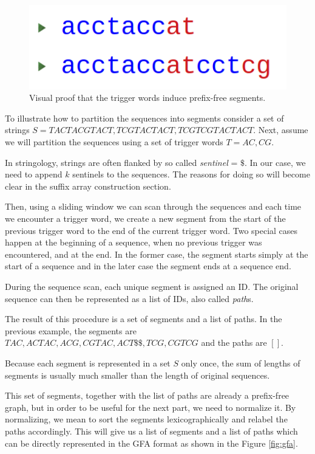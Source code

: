 \documentclass[twocolumn]{ceurart}
\begin{document}
\begin{figure}
    \centering
    \includegraphics[width=\linewidth]{images/prefixfree_proof.png}
    \caption{Visual proof that the trigger words induce prefix-free segments.}
    \label{fig:proof}
\end{figure}

To illustrate how to partition the sequences into segments consider a set of
strings $S = {TACTACGTACT, TCGTACTACT, TCGTCGTACTACT}$.
Next, assume we will partition the sequences using a set of trigger words 
$T = {AC, CG}$.

In stringology, strings are often flanked by so called \emph{sentinel} = $\$$.
In our case, we need to append $k$ sentinels to the sequences.
The reasons for doing so will become clear in the suffix array construction section.

Then, using a sliding window we can scan through the sequences and each time we
encounter a trigger word, we create a new segment from the start of the previous
trigger word to the end of the current trigger word.
Two special cases happen at the beginning of a sequence, when no previous
trigger was encountered, and at the end.
In the former case, the segment starts simply at the start of a sequence and in
the later case the segment ends at a sequence end.

During the sequence scan, each unique segment is assigned an ID.
The original sequence can then be represented as a list of IDs, also called 
\emph{path}s.

The result of this procedure is a set of segments and a list of paths.
In the previous example, the segments are ${ TAC, ACTAC, ACG, CGTAC, ACT\$\$, TCG, CGTCG }$
and the paths are $[  ]$.

Because each segment is represented in a set $S$ only once, the sum of lengths
of segments is usually much smaller than the length of original sequences.

This set of segments, together with the list of paths are already a prefix-free
graph, but in order to be useful for the next part, we need to normalize it.
By normalizing, we mean to sort the segments lexicographically and relabel the
paths accordingly.
This will give us a list of segments and a list of paths which can be directly
represented in the GFA format as shown in the Figure \ref{fig:gfa}.
\end{document}

